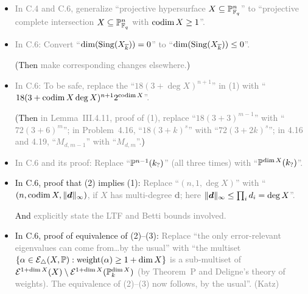 \documentclass[12pt]{article}
\begin{document}
\begin{itemize}
\begin{itemize}
        \item \textcolor{gray}{In C.4 and C.6,
        generalize ``projective hypersurface $X\subseteq \mathbb{P}^n_{\mathbb{F}_q}$'' to ``projective complete intersection $X\subseteq \mathbb{P}^n_{\mathbb{F}_q}$ with $\operatorname{codim}{X}\geq 1$''.
        }
        
        \item \textcolor{gray}{In C.6:
        Convert ``$\dim(\operatorname{Sing}(X_{\overline{k}}))=0$'' to ``$\dim(\operatorname{Sing}(X_{\overline{k}}))\leq 0$''.}
        
        (Then \textcolor{gray}{make corresponding changes elsewhere.})
        
        \item \textcolor{gray}{In C.6:
        To be safe, replace the ``$18(3+\deg{X})^{n+1}$'' in (1) with ``$18(3+\operatorname{codim}{X}\deg{X})^{n+1}2^{\operatorname{codim}{X}}$''.}
        
        (Then \textcolor{gray}{in Lemma~III.4.11, proof of (1),
        replace ``$18(3+3)^{m-1}$'' with ``$72(3+6)^m$'';
        in Problem~4.16,
        ``$18(3+k)^s$'' with ``$72(3+2k)^s$'';
        in 4.16 and 4.19,
        ``$M_{d,m-1}$'' with ``$M_{d,m}$''.})
        
        \item \textcolor{gray}{In C.6 and its proof:
        Replace ``$\mathbb{P}^{n-1}(k_?)$'' (all three times) with ``$\mathbb{P}^{\dim{X}}(k_?)$''.}
        
        \item In C.6, proof that (2) implies (1):
        \textcolor{gray}{Replace ``$(n,1,\deg{X})$'' with ``$(n,\operatorname{codim}{X},\lVert \bm{d} \rVert_\infty)$,
        if $X$ has multi-degree $\bm{d}$;
        here $\lVert \bm{d} \rVert_\infty\leq \prod_{i}d_i = \deg{X}$''.}
        
        And \textcolor{gray}{explicitly state the LTF and Betti bounds involved.
        }
        
        \item In C.6, proof of equivalence of (2)--(3):
        \textcolor{gray}{Replace ``the only error-relevant eigenvalues can come from\dots by the usual'' with ``the multiset $\{\alpha\in \mathcal{E}_{\triangle}(X,\mathbb{P}): \operatorname{weight}(\alpha)\geq 1+\dim{X}\}$
        is a sub-multiset of $\mathcal{E}^{1+\dim{X}}(X)\setminus \mathcal{E}^{1+\dim{X}}(\mathbb{P}^{\dim{X}}_k)$ (by Theorem~P and Deligne's theory of weights). The equivalence of (2)--(3) now follows, by the usual''.
        (Katz)}
        

\end{itemize}
\end{itemize}
\end{document}
